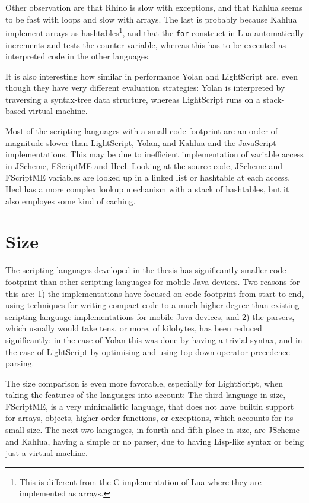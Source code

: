 \documentclass[11pt]{report}
\begin{document}
Other observation are that Rhino is slow with exceptions, and that Kahlua seems to be fast with loops and slow with arrays. The last is probably because Kahlua implement arrays as hashtables\footnote{This is different from the C implementation of Lua where they are implemented as arrays.}, and that the \verb|for|-construct in Lua automatically increments and tests the counter variable, whereas this has to be executed as interpreted code in the other languages.

It is also interesting how similar in performance Yolan and LightScript are, even though they have very different evaluation strategies: Yolan is interpreted by traversing a syntax-tree data structure, whereas LightScript runs on a stack-based virtual machine. 

Most of the scripting languages with a small code footprint are an order of magnitude slower than LightScript, Yolan, and Kahlua and the JavaScript implementations.
This may be due to inefficient implementation of variable access in JScheme, FScriptME and Hecl. Looking at the source code, JScheme and FScriptME variables are looked up in a linked list or hashtable at each access. Hecl has a more complex lookup mechanism with a stack of hashtables, but it also employes some kind of caching.

\section{Size}

The scripting languages developed in the thesis has significantly smaller code footprint than other scripting languages for mobile Java devices.
Two reasons for this are: 1) the implementations have focused on code footprint from start to end, using techniques for writing compact code to a much higher degree than existing scripting language implementations for mobile Java devices, and 2) the parsers, which usually would take tens, or more, of kilobytes, has been reduced significantly: in the case of Yolan this was done by having a trivial syntax, and in the case of LightScript by optimising and using top-down operator precedence parsing.

The size comparison is even more favorable, especially for LightScript, when taking the features of the languages into account:
The third language in size, FScriptME, is a very minimalistic language, that does not have builtin support for arrays, objects, higher-order functions, or exceptions, which accounts for its small size.
The next two languages, in fourth and fifth place in size, are JScheme and Kahlua,
having a simple or no parser, due to having Lisp-like syntax or being just a virtual machine.
\end{document}

